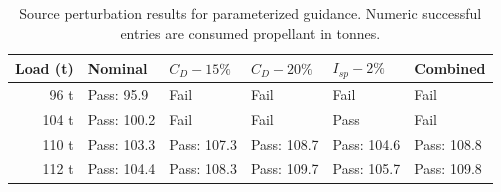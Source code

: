\begin{table}[htbp]
\caption{Source perturbation results for parameterized guidance. Numeric successful entries are consumed propellant in tonnes.}
\label{tab:src16}
\small
\setlength{\tabcolsep}{3.5pt}
\begin{tabularx}{\linewidth}{@{}rXXXXX@{}}
\toprule
Load (t) & Nominal & $C_D-15\%$ & $C_D-20\%$ & $I_{sp}-2\%$ & Combined \\
\midrule
96 t & Pass: 95.9 & Fail & Fail & Fail & Fail \\
104 t & Pass: 100.2 & Fail & Fail & Pass & Fail \\
110 t & Pass: 103.3 & Pass: 107.3 & Pass: 108.7 & Pass: 104.6 & Pass: 108.8 \\
112 t & Pass: 104.4 & Pass: 108.3 & Pass: 109.7 & Pass: 105.7 & Pass: 109.8 \\
\bottomrule
\end{tabularx}
\end{table}
